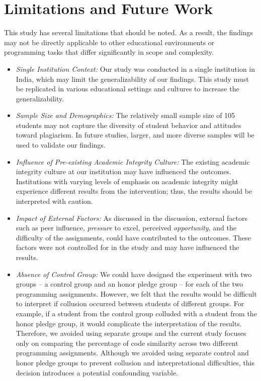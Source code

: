 \section{Limitations and Future Work}
\label{sec:limitations}
This study has several limitations that should be noted. As a result, the findings may not be directly applicable to other educational environments or programming tasks that differ significantly in scope and complexity.

\begin{itemize}
    \item \textit{Single Institution Context:} Our study was conducted in a single institution in India, which may limit the generalizability of our findings. This study must be replicated in various educational settings and cultures to increase the generalizability. 
    \item \textit{Sample Size and Demographics:} The relatively small sample size of 105 students may not capture the diversity of student behavior and attitudes toward plagiarism. In future studies, larger, and more diverse samples will be used to validate our findings.
    \item \textit{Influence of Pre-existing Academic Integrity Culture:} The existing academic integrity culture at our institution may have influenced the outcomes. Institutions with varying levels of emphasis on academic integrity might experience different results from the intervention; thus, the results should be interpreted with caution.
    \item \textit{Impact of External Factors:} As discussed in the discussion, external factors such as peer influence, \textit{pressure} to excel, perceived \textit{opportunity}, and the difficulty of the assignments, could have contributed to the outcomes. These factors were not controlled for in the study and may have influenced the results.
    \item \textit{Absence of Control Group:} We could have designed the experiment with two groups – a control group and an honor pledge group – for each of the two programming assignments. However, we felt that the results would be difficult to interpret if collusion occurred between students of different groups. For example, if a student from the control group colluded with a student from the honor pledge group, it would complicate the interpretation of the results. Therefore, we avoided using separate groups and the current study focuses only on comparing the percentage of code similarity across two different programming assignments. Although we avoided using separate control and honor pledge groups to prevent collusion and interpretational difficulties, this decision introduces a potential confounding variable.

\end{itemize}
